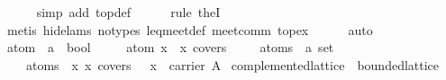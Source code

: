 \begin{isabellebody}
%
\isadelimproof
\ \ \ \ %
\endisadelimproof
%
\isatagproof
{}\isamarkupfalse%
\ {}simp\ add{}\ top{}def{}\isanewline
\ \ \ \ \isamarkupfalse%
\ {}rule\ the{}I{}{}\isanewline
\ \ \ \ \isamarkupfalse%
\ {}metis\ {}hide{}lams{}\ no{}types{}\ leq{}meet{}def\ meet{}comm\ top{}ex{}\isanewline
\ \ \ \ \isamarkupfalse%
\ auto%
\endisatagproof
{\isafoldproof}%
%
\isadelimproof
\isanewline
%
\endisadelimproof
\isanewline
\ \ \isamarkupfalse%
\ atom\ {}{}\ {}{}a\ {}\ bool{}\ \isanewline
\ \ \ \ {}atom\ x\ {}\ x\ covers\ {}{}\isanewline
\isanewline
\ \ \isamarkupfalse%
\ atoms\ {}{}\ {}{}a\ set{}\ \isanewline
\ \ \ \ {}atoms\ {}\ {}x{}\ x\ covers\ {}\ {}\ x\ {}\ carrier\ A{}{}\isanewline
\isanewline
{}\isamarkupfalse%
%
\isamarkuptrue%
\isamarkupfalse%
\ complemented{}lattice\ {}\ bounded{}lattice\ {}\isanewline

\end{isabellebody}
